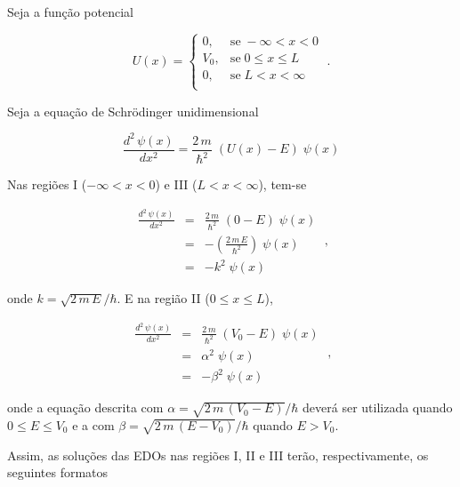 Seja a função potencial

\begin{equation}
	U(x) =
	\begin{cases}
		0,   & \mbox{se}\; -\infty<x<0   \\
		V_0, & \mbox{se}\; 0 \le x \le L \\
		0,   & \mbox{se}\; L<x<\infty    \\
	\end{cases}\;.
\end{equation}

Seja a equação de Schrödinger unidimensional

\begin{equation}
	\frac{d^2\,\psi(x)}{dx^2} = \frac{2\,m}{\hbar^2}\;(U(x)-E)\;\psi(x)
\end{equation}

Nas regiões I ($-\infty<x<0$) e III ($L<x<\infty$), tem-se

\begin{equation}
	\begin{array}{lcl}
		\frac{d^2\,\psi(x)}{dx^2} & = & \frac{2\,m}{\hbar^2}\;(0-E)\;\psi(x)     \\
		                          & = & - \left(\frac{2\,m\,E}{\hbar^2}\right)\;
		\psi(x)                                                                  \\
		                          & = & - k^{2}\;\psi(x)
	\end{array}\;,
\end{equation}

\noindent onde $k = \sqrt{2\,m\,E}/\hbar$. E na região II ($0 \le x \le L$),

\begin{equation}
	\begin{array}{lcl}
		\frac{d^2\,\psi(x)}{dx^2} & = & \frac{2\,m}{\hbar^2}\;(V_0-E)\;\psi(x) \\
		                          & = & \alpha^{2}\;\psi(x)                    \\
		                          & = & -\beta^{2}\;\psi(x)
	\end{array}\;,
\end{equation}

\noindent onde a equação descrita com $\alpha = \sqrt{2\,m\,(V_0 - E)}/\hbar$
deverá ser utilizada quando $0 \le E \le V_0$ e a com
$\beta = \sqrt{2\,m\,(E- V_0)}/\hbar$ quando $E > V_0$.

Assim, as soluções das EDOs nas regiões I, II e III terão, respectivamente, os
seguintes formatos

